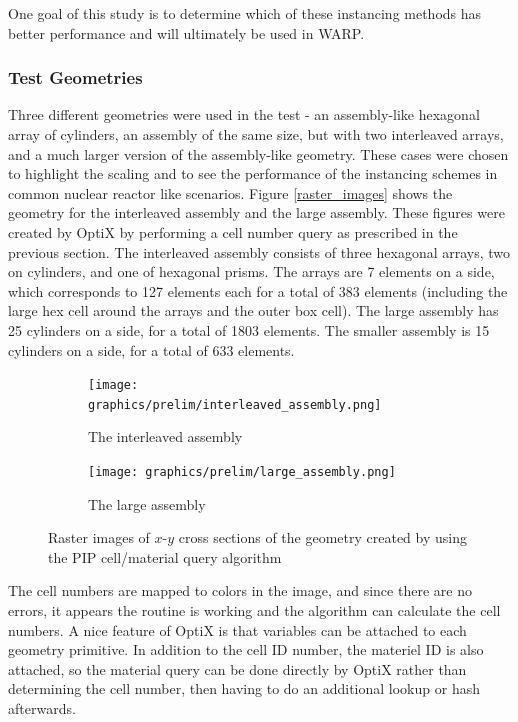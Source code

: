 One goal of this study is to determine which of these instancing methods has better performance and will ultimately be used in WARP.

\subsubsection{Test Geometries}

Three different geometries were used in the test - an assembly-like hexagonal array of cylinders, an assembly of the same size, but with two interleaved arrays, and a much larger version of the assembly-like geometry. These cases were chosen to highlight the scaling and to see the performance of the instancing schemes in common nuclear reactor like scenarios.  Figure \ref{raster_images} shows the geometry for the interleaved assembly and the large assembly.  These figures were created by OptiX by performing a cell number query as prescribed in the previous section.  The interleaved assembly consists of three hexagonal arrays, two on cylinders, and one of hexagonal prisms.  The arrays are 7 elements on a side, which corresponds to 127 elements each for a total of 383 elements (including the large hex cell around the arrays and the outer box cell).  The large assembly has 25 cylinders on a side, for a total of 1803 elements.  The smaller assembly is 15 cylinders on a side, for a total of 633 elements.

\begin{figure}[h!]
\centering
\begin{subfigure}{.5\textwidth}
  \centering
  \texttt{[image: graphics/prelim/interleaved\_assembly.png]}
  \caption{The interleaved assembly}
  \label{fig:sub1}
\end{subfigure}%
\begin{subfigure}{.5\textwidth}
  \centering
  \texttt{[image: graphics/prelim/large\_assembly.png]}
  \caption{The large assembly}
  \label{fig:sub2}
\end{subfigure}
\caption{Raster images of $x$-$y$ cross sections of the geometry created by using the PIP cell/material query algorithm \label{raster_images}}
\label{fig:test}
\end{figure}

The cell numbers are mapped to colors in the image, and since there are no errors, it appears the routine is working and the algorithm can calculate the cell numbers.  A nice feature of OptiX is that variables can be attached to each geometry primitive.  In addition to the cell ID number, the materiel ID is also attached, so the material query can be done directly by OptiX rather than determining the cell number, then having to do an additional lookup or hash afterwards.


